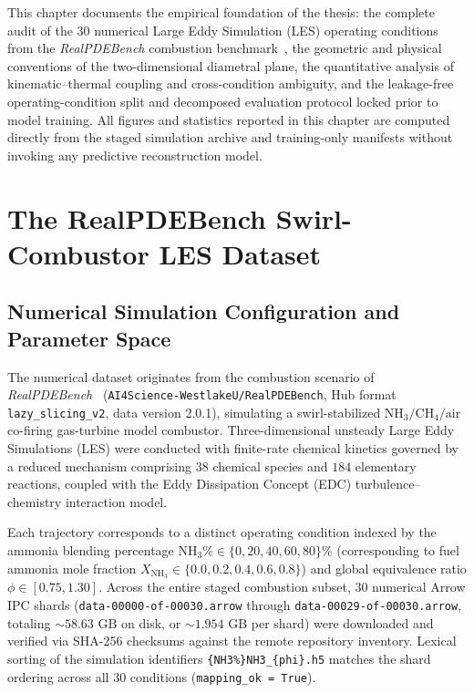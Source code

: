 
This chapter documents the empirical foundation of the thesis: the complete audit of the 30 numerical Large Eddy Simulation (LES) operating conditions from the \textit{RealPDEBench} combustion benchmark~\cite{hu2026realpdebench}, the geometric and physical conventions of the two-dimensional diametral plane, the quantitative analysis of kinematic--thermal coupling and cross-condition ambiguity, and the leakage-free operating-condition split and decomposed evaluation protocol locked prior to model training. All figures and statistics reported in this chapter are computed directly from the staged simulation archive and training-only manifests without invoking any predictive reconstruction model.

\section{The RealPDEBench Swirl-Combustor LES Dataset}
\label{sec:data_overview}

\subsection{Numerical Simulation Configuration and Parameter Space}
\label{subsec:data_sim_config}

The numerical dataset originates from the combustion scenario of \textit{RealPDEBench}~\cite{hu2026realpdebench} (\texttt{AI4Science-WestlakeU/RealPDEBench}, Hub format \texttt{lazy\_slicing\_v2}, data version 2.0.1), simulating a swirl-stabilized $\text{NH}_3/\text{CH}_4/\text{air}$ co-firing gas-turbine model combustor. Three-dimensional unsteady Large Eddy Simulations (LES) were conducted with finite-rate chemical kinetics governed by a reduced mechanism comprising $38$ chemical species and $184$ elementary reactions, coupled with the Eddy Dissipation Concept (EDC) turbulence--chemistry interaction model.

Each trajectory corresponds to a distinct operating condition indexed by the ammonia blending percentage $\text{NH}_3\% \in \{0, 20, 40, 60, 80\}\%$ (corresponding to fuel ammonia mole fraction $X_{\text{NH}_3} \in \{0.0, 0.2, 0.4, 0.6, 0.8\}$) and global equivalence ratio $\phi \in [0.75, 1.30]$. Across the entire staged combustion subset, $30$ numerical Arrow IPC shards (\texttt{data-00000-of-00030.arrow} through \texttt{data-00029-of-00030.arrow}, totaling $\sim 58.63\text{ GB}$ on disk, or $\sim 1.954\text{ GB}$ per shard) were downloaded and verified via SHA-256 checksums against the remote repository inventory. Lexical sorting of the simulation identifiers \texttt{\{NH3\%\}NH3\_\{phi\}.h5} matches the shard ordering across all 30 conditions (\texttt{mapping\_ok = True}).

